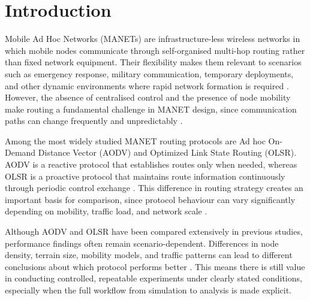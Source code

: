 \documentclass{Academic}
\begin{document}
\myabstract{}
\renewcommand{\myTitle}{Performance Evaluation of AODV and OLSR Routing Protocols in NS-3 with AI-Assisted Analysis}
\renewcommand{\MyAuthor}{Anthony Edjenuwa}
\renewcommand{\MyDepartment}{Systems \& Security Engineer | Founder, ArxNova Networks }
\renewcommand{\ID}{info@edjenuwa.tech}
\renewcommand{\Keywords}{MANET, NS-3, AODV, OLSR, FlowMonitor, routing protocols, performance evaluation, packet delivery ratio, throughput, delay, jitter, packet loss, AI-assisted analysis}
\maketitle
\onehalfspacing

\section{Introduction}

Mobile Ad Hoc Networks (MANETs) are infrastructure-less wireless networks in which mobile nodes communicate through self-organised multi-hop routing rather than fixed network equipment. Their flexibility makes them relevant to scenarios such as emergency response, military communication, temporary deployments, and other dynamic environments where rapid network formation is required \parencite{boukerche2009,loo2016,sarkar2016}. However, the absence of centralised control and the presence of node mobility make routing a fundamental challenge in MANET design, since communication paths can change frequently and unpredictably \parencite{perkins2003aodv,clausen2003olsr,patel2015}.

Among the most widely studied MANET routing protocols are Ad hoc On-Demand Distance Vector (AODV) and Optimized Link State Routing (OLSR). AODV is a reactive protocol that establishes routes only when needed, whereas OLSR is a proactive protocol that maintains route information continuously through periodic control exchange \parencite{perkins2003aodv,clausen2003olsr}. This difference in routing strategy creates an important basis for comparison, since protocol behaviour can vary significantly depending on mobility, traffic load, and network scale \parencite{radha2018,kurniawan2020,sarkar2025}.

Although AODV and OLSR have been compared extensively in previous studies, performance findings often remain scenario-dependent. Differences in node density, terrain size, mobility models, and traffic patterns can lead to different conclusions about which protocol performs better \parencite{spaho2013,sallam2015,sallum2018,wang2022,kour2025}. This means there is still value in conducting controlled, repeatable experiments under clearly stated conditions, especially when the full workflow from simulation to analysis is made explicit.
\end{document}

